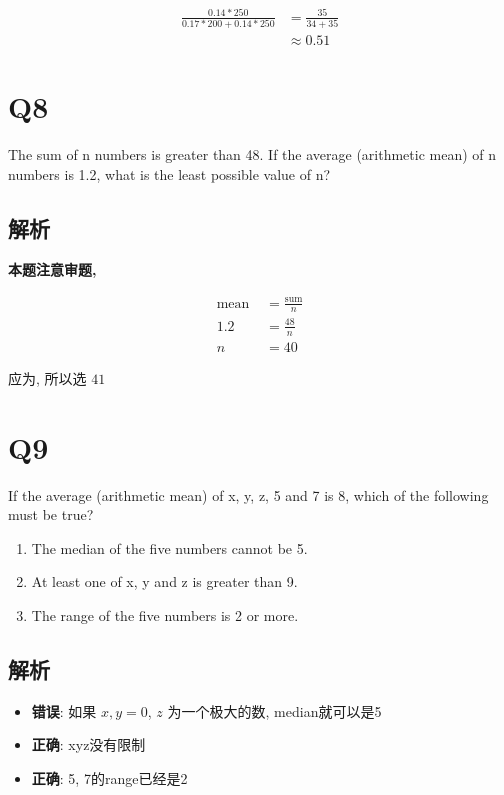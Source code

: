     \begin{align*}
      \frac{0.14 * 250}{0.17 * 200 + 0.14 * 250}
      &= \frac{35}{34 + 35} \\
      &\approx 0.51
    \end{align*}

\section{Q8}

  The sum of n numbers is greater than 48. If the average (arithmetic mean)
  of n numbers is 1.2, what is the least possible value of n?

  \subsection{解析}

    \textbf{本题注意审题, }

    \begin{align*}
      \text{mean } &= \frac{\text{sum}}{n} \\
      1.2 &= \frac{48}{n} \\
      n &= 40
    \end{align*}

    应为, 所以选 $ 41 $

\section{Q9}

  If the average (arithmetic mean) of x, y, z, 5 and 7 is 8, which of the
  following must be true?

  \begin{enumerate}
    \item The median of the five numbers cannot be 5.
    \item At least one of x, y and z is greater than 9.
    \item The range of the five numbers is 2 or more.
  \end{enumerate}

  \subsection{解析}

    \begin{itemize}
      \item \textbf{错误}: 如果 $ x, y = 0 $, $ z $ 为一个极大的数, median就可以是5
      \item \textbf{正确}: xyz没有限制
      \item \textbf{正确}: 5, 7的range已经是2
    \end{itemize}


